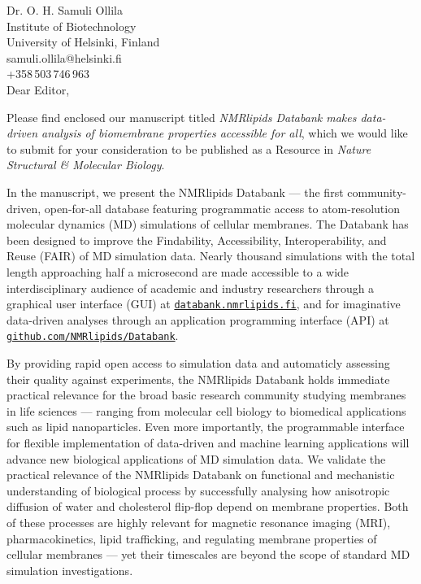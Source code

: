 \documentclass[11pt]{letter}
\begin{document}
\reversemarginpar
\pagestyle{empty}
\noindent Dr. O. H. Samuli Ollila \\
\noindent Institute of Biotechnology \\
\noindent University of Helsinki, Finland \\
\noindent samuli.ollila@helsinki.fi\\
\noindent +358\,503\,746\,963 \\


Dear Editor,

Please find enclosed our manuscript titled
{\it NMRlipids Databank makes data-driven analysis of biomembrane properties accessible for all}, which we would like to submit for your consideration to be published as a Resource in \textit{ Nature Structural \& Molecular Biology}.

In the manuscript, we present the NMRlipids Databank --- the first community-driven, open-for-all database featuring programmatic access to atom-resolution molecular dynamics (MD) simulations of cellular membranes. The Databank has been designed to improve the Findability, Accessibility, Interoperability, and Reuse (FAIR) of MD simulation data. Nearly thousand simulations with the total length approaching half a microsecond are made accessible to a wide interdisciplinary audience of academic and industry researchers through a graphical user interface (GUI) at \href{https://databank.nmrlipids.fi/}{\tt databank.nmrlipids.fi}, and for imaginative data-driven analyses through an application programming interface (API) at \href{https://github.com/NMRlipids/Databank}{\tt github.com/NMRlipids/Databank}.

By providing rapid open access to simulation data and automaticly assessing their quality against experiments, the NMRlipids Databank holds immediate practical relevance for the broad basic research community studying membranes in life sciences --- ranging from molecular cell biology to biomedical applications such as lipid nanoparticles. Even more importantly, the programmable interface for flexible implementation of data-driven and machine learning applications will advance new biological applications of MD simulation data. We validate the practical relevance of the NMRlipids Databank on functional and mechanistic understanding of biological process 
by successfully analysing how anisotropic diffusion of water and cholesterol flip-flop depend on membrane properties. Both of these processes are highly relevant for magnetic resonance imaging (MRI), pharmacokinetics, lipid trafficking, and regulating membrane properties of cellular membranes --- yet their timescales are beyond the scope of standard MD simulation investigations. 
\end{document}
